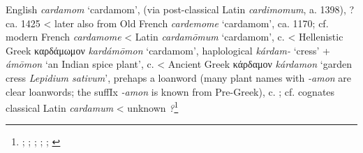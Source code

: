 \begin{etymology}\label{ety:cardamom}
English \textit{cardamom} `cardamom', (via post-classical Latin \textit{cardimomum}, a. 1398), ?ca. 1425
< later also from Old French \textit{cardemome} `cardamom', ca. 1170; cf. modern French \textit{cardamome}
< Latin \textit{cardamōmum} `cardamom',  c. \AD{}
< Hellenistic Greek {καρδάμωμον} \textit{kardámōmon} `cardamom', haplological  \textit{kárdam-} `cress' +  \textit{ámōmon} `an Indian spice plant',  c. \BC{}
< Ancient Greek {κάρδαμον} \textit{kárdamon} `garden cress \textit{Lepidium sativum}', prehaps a loanword (many plant names with \textit{-amon} are clear loanwords; the suffIx \textit{-amon} is known from Pre-Greek),  c. \BC{}; cf. cognates classical Latin \textit{cardamum}
< unknown \textit{?}\footnote{\textcite[s.v. cardamom]{oed}; \textcite[s.v. cardamome]{tlfi}; \textcite[s.v. cardamomum]{lewis_latin_1879}; \textcite[s.v. καρδάμωμον]{liddell_greek-english_1940}; \textcite[s.v. κάρδαμον]{liddell_greek-english_1940}; \textcite[644]{beekes_etymological_2010}}
\end{etymology}